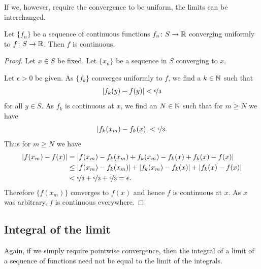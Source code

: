 If we, however, require the convergence to be uniform, the limits can
be interchanged.

\begin{thm}
Let $\{ f_n \}$ be 
a sequence of continuous functions $f_n \colon S \to {\mathbb{R}}$ converging
uniformly to  $f \colon S \to {\mathbb{R}}$.  Then $f$ is continuous.
\end{thm}

\begin{proof}
Let $x \in S$ be fixed.  Let $\{ x_n \}$ be a sequence in $S$
converging to $x$.

Let $\epsilon > 0$ be given.
As $\{ f_k \}$ converges uniformly to $f$, we find a $k \in {\mathbb{N}}$ such that
\begin{equation*}
\left\lvert {f_k(y)-f(y)} \right\rvert < \nicefrac{\epsilon}{3}
\end{equation*}
for all $y \in S$.  As $f_k$ is continuous at $x$,
we find an $N \in {\mathbb{N}}$ such that for $m \geq N$
we have 
\begin{equation*}
\left\lvert {f_k(x_m)-f_k(x)} \right\rvert < \nicefrac{\epsilon}{3} .
\end{equation*}
Thus for
$m \geq N$ we have
\begin{equation*}
\begin{split}
\left\lvert {f(x_m)-f(x)} \right\rvert
& =
\left\lvert {f(x_m)-f_k(x_m)+f_k(x_m)-f_k(x)+f_k(x)-f(x)} \right\rvert
\\
& \leq
\left\lvert {f(x_m)-f_k(x_m)} \right\rvert+
\left\lvert {f_k(x_m)-f_k(x)} \right\rvert+
\left\lvert {f_k(x)-f(x)} \right\rvert
\\
& <
\nicefrac{\epsilon}{3} +
\nicefrac{\epsilon}{3} +
\nicefrac{\epsilon}{3} = \epsilon .
\end{split}
\end{equation*}
Therefore $\bigl\{ f(x_m) \bigr\}$ converges to $f(x)$ and hence $f$ is continuous at
$x$.  As $x$ was arbitrary, $f$ is continuous everywhere.
\end{proof}

\subsection{Integral of the limit}

Again, if we simply require pointwise convergence, then the integral
of a limit of a sequence of functions need not be equal to the limit
of the integrals.

